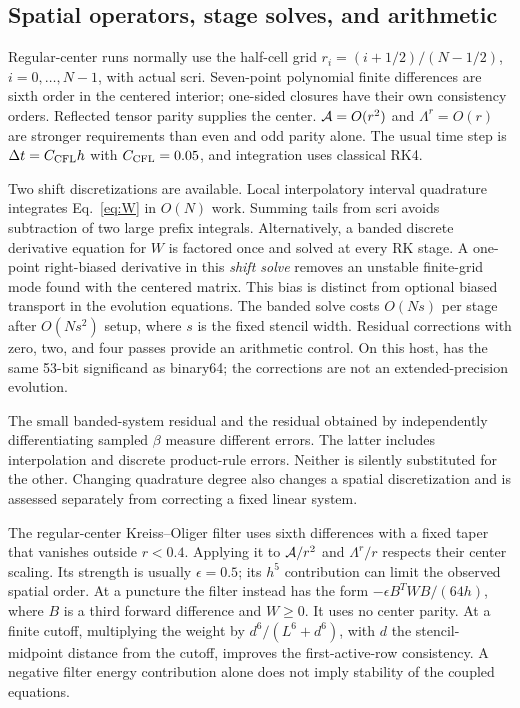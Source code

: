 \subsection{Spatial operators, stage solves, and arithmetic}
Regular-center runs normally use the half-cell grid $r_i=(i+1/2)/(N-1/2)$, $i=0,\ldots,N-1$, with actual scri. Seven-point polynomial finite differences are sixth order in the centered interior; one-sided closures have their own consistency orders. Reflected tensor parity supplies the center. $\mathcal A=O(r^2)$ and $\Lambda^r=O(r)$ are stronger requirements than even and odd parity alone. The usual time step is $\Delta t=C_{\rm CFL}h$ with $C_{\rm CFL}=0.05$, and integration uses classical RK4.

Two shift discretizations are available. Local interpolatory interval quadrature integrates Eq.~\eqref{eq:W} in $O(N)$ work. Summing tails from scri avoids subtraction of two large prefix integrals. Alternatively, a banded discrete derivative equation for $W$ is factored once and solved at every RK stage. A one-point right-biased derivative in this \emph{shift solve} removes an unstable finite-grid mode found with the centered matrix. This bias is distinct from optional biased transport in the evolution equations. The banded solve costs $O(Ns)$ per stage after $O(Ns^2)$ setup, where $s$ is the fixed stencil width. Residual corrections with zero, two, and four passes provide an arithmetic control. On this host,  has the same 53-bit significand as binary64; the corrections are not an extended-precision evolution.

The small banded-system residual and the residual obtained by independently differentiating sampled $\beta$ measure different errors. The latter includes interpolation and discrete product-rule errors. Neither is silently substituted for the other. Changing quadrature degree also changes a spatial discretization and is assessed separately from correcting a fixed linear system.

The regular-center Kreiss--Oliger filter uses sixth differences with a fixed taper that vanishes outside $r<0.4$. Applying it to $\mathcal A/r^2$ and $\Lambda^r/r$ respects their center scaling. Its strength is usually $\epsilon=0.5$; its $h^5$ contribution can limit the observed spatial order. At a puncture the filter instead has the form $-\epsilon B^TWB/(64h)$, where $B$ is a third forward difference and $W\geq0$. It uses no center parity. At a finite cutoff, multiplying the weight by $d^6/(L^6+d^6)$, with $d$ the stencil-midpoint distance from the cutoff, improves the first-active-row consistency. A negative filter energy contribution alone does not imply stability of the coupled equations.

